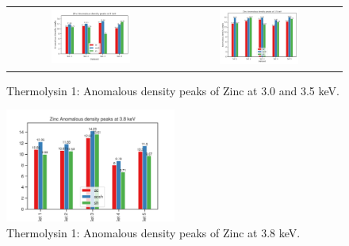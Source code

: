 \begin{figure}
    \centering
    \begin{tabular}{cc}
        \includegraphics[width = 0.5\textwidth]{plots/exp1/tlys_2_P6122/peaks/3p0_zn_2Dbar.png} & \includegraphics[width = 0.5\textwidth]{plots/exp1/tlys_2_P6122/peaks/3p5_zn_2Dbar.png}
    \end{tabular}
    \caption{Thermolysin 1: Anomalous density peaks of Zinc at 3.0 and 3.5 \unit{keV}.}
    \label{fig:tlys9_zn_peaks_3p0_3p5}
\end{figure}

\begin{figure}
    \centering
    \includegraphics[width = 0.5\textwidth]{plots/exp1/tlys_9_P6122/peaks/3p8_zn405_peaks.png}
    \caption{Thermolysin 1: Anomalous density peaks of Zinc at 3.8 \unit{keV}.}
    \label{fig:tlys9_zn_peaks_3p8}
\end{figure}


